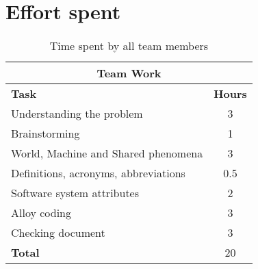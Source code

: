 \documentclass[../RASD.tex]{subfiles}
\begin{document}
    \chapter{Effort spent}\label{ch:effort-spent}
    \begin{table}[h]
        \centering
        \begin{tabular}{l c}
            \hline\hline
            \multicolumn{2}{c}{\textbf{Team Work}} \\
            \hline
            \textbf{Task} & \textbf{Hours} \\ [0.5ex]
            \hline
            Understanding the problem & 3  \\
            Brainstorming & 1 \\
            World, Machine and Shared phenomena & 3 \\
            Definitions, acronyms, abbreviations & 0.5  \\
            Software system attributes & 2 \\
            Alloy coding & 3 \\
            Checking document  & 3  \\
            \hline
            \textbf{Total} & 20  \\
            \hline
        \end{tabular}
        \caption{Time spent by all team members}
        \label{fig:Time spent by all team members}
    \end{table}
\end{document}
